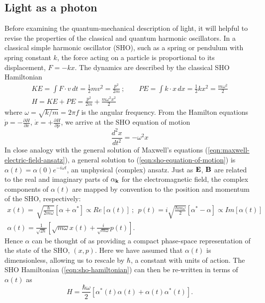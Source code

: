 \subsection{Light as a photon}  
\label{sec:light-as-a-photon}
Before examining the quantum-mechanical description of light, it will helpful to revise the properties of the classical and quantum harmonic oscillators. In a classical simple harmonic oscillator (SHO), such as a spring or pendulum with spring constant $k$, the force acting on a particle is proportional to its displacement, $F=-kx$. The dynamics are described by the classical SHO Hamiltonian
\begin{gather}
KE =  \int F \cdot v \, dt = \frac{1}{2}mv^2 = \frac{p^2}{2m} ~; \qquad
PE =  \int k \cdot x \, dx = \frac{1}{2}kx^2 = \frac{m\omega^2}{2}\\
H =KE + PE = \frac{p^2}{2m} + \frac{m\omega^2x^2}{2}
\label{eqn:sho-hamiltonian}
\end{gather}
where $\omega=\sqrt{k/m}=2\pi f$ is the angular frequency. 
From the Hamilton equations $\dot{p} = -\frac{\partial H}{\partial x}$, $\dot{x} = +\frac{\partial H}{\partial p}$, we arrive at the SHO equation of motion
\begin{equation}
    \frac{d^2x}{dt^2} = -\omega^2 x
    \label{eqn:sho-equation-of-motion}
\end{equation}
In close analogy with the general solution of Maxwell's equations (\ref{eqn:maxwell-electric-field-ansatz}), a general solution to (\ref{eqn:sho-equation-of-motion})
is $\alpha(t) = \alpha(0)e^{-i\omega t}$,
an unphysical (complex) ansatz. Just as $\mathbf{E}$, $\mathbf{B}$ are related to the real and imaginary parts of $\alpha_{\mathbf{k}}$ for the electromagnetic field, the complex components of $\alpha(t)$ are mapped by convention to the position and momentum of the SHO, respectively:
\begin{gather}
   x(t) = \, \sqrt{\frac{\hbar}{2m\omega}} 
   \left[ \alpha + \alpha^* \right] 
   \propto Re\left[ \alpha(t) \right] ~; ~~
   p(t) = i \sqrt{\frac{\hbar m \omega}{2}} 
   \left[ \alpha^* - \alpha\right] 
   \propto Im\left[ \alpha(t) \right] 
   \label{eqn:sho-solution}
   \\
   \alpha(t) = \frac{1}{\sqrt{2\hbar}}
   \left[ 
   \sqrt{m\omega} x(t) + 
   \frac{i}{\sqrt{m \omega}} 
   p(t) 
   \right].
\end{gather}
Hence $\alpha$ can be thought of as providing a compact phase-space representation of the state of the SHO, $(x,p)$.
Here we have assumed that $\alpha(t)$ is dimensionless, allowing us to rescale by $\hbar$, a constant with units of action. The SHO Hamiltonian (\ref{eqn:sho-hamiltonian}) can then be re-written in terms of $\alpha(t)$ as 
\begin{equation}
    H = \frac{\hbar \omega}{2} \left[ \alpha^*(t) \alpha(t) + \alpha(t)\alpha^*(t) \right].
\end{equation}

